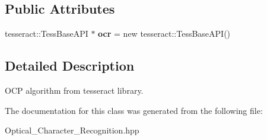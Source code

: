 \subsection*{Public Attributes}
\begin{DoxyCompactItemize}
\item 
\mbox{\label{class_optical___character___recognition_ad3fdb2f00dd03892c0e25ace9795ed42}} 
tesseract\+::\+Tess\+Base\+A\+PI $\ast$ {\bfseries ocr} = new tesseract\+::\+Tess\+Base\+A\+PI()
\end{DoxyCompactItemize}


\subsection{Detailed Description}
O\+CP algorithm from tesseract library. 

The documentation for this class was generated from the following file\+:\begin{DoxyCompactItemize}
\item 
Optical\+\_\+\+Character\+\_\+\+Recognition.\+hpp\end{DoxyCompactItemize}
